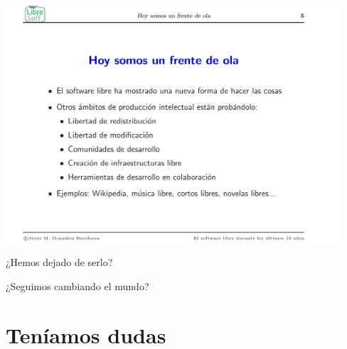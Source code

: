 \documentclass[17pt,aspectratio=169]{beamer}
\begin{document}
\begin{frame}

\begin{center}
  \includegraphics[width=12.5cm]{figs/transpas-06}
\end{center}  

\end{frame}

\begin{frame}

  \begin{center}
    {\large
      ¿Hemos dejado de serlo? \\

      \vspace{1cm}
      
      ¿Seguimos cambiando el mundo? \\
    }
  \end{center}
  
\end{frame}

\section{Teníamos dudas}
\end{document}
